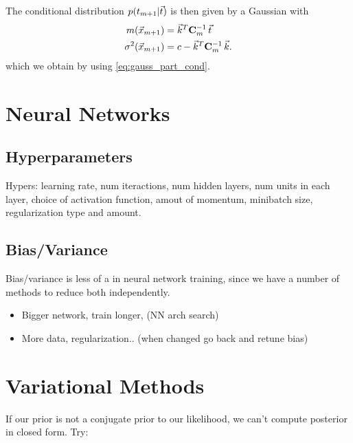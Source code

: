 \documentclass[11pt]{article}
\begin{document}
The conditional distribution $p(t_{m+1} | \vec{t})$ is then given by a Gaussian with
\begin{align}
  m(\vec{x}_{m+1})         &= \vec{k}^T \mathbf{C}_m^{-1}\, \vec{t}\\
  \sigma^2 (\vec{x}_{m+1}) &= c - \vec{k}^T \mathbf{C}_m^{-1}\, \vec{k}.
\end{align}
which we obtain by using \ref{eq:gauss_part_cond}.




\section{Neural Networks}
\label{sec:nn}

\subsection{Hyperparameters}
Hypers: learning rate, num iteractions, num hidden layers, num units in each layer,
choice of activation function, amout of momentum, minibatch size, regularization type
and amount.

\subsection{Bias/Variance}

Bias/variance is less of a  in neural network training, since we have a
number of methods to reduce both independently.
\begin{itemize}
  \item {} Bigger network, train longer, (NN arch
  search)
  \item {} More data, regularization.. (when changed
  go back and retune bias)
\end{itemize}


\section{Variational Methods}
\label{sec:var_meth}

If our prior is not a conjugate prior to our likelihood, we can't compute posterior in
closed form. Try:
\end{document}
